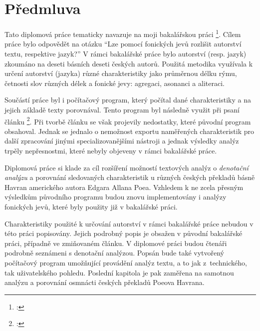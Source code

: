 \documentclass[dp.tex]{subfiles}
\begin{document}
\chapter*{Předmluva}
\label{chap:predmluva} 

Tato diplomová práce tematicky navazuje na moji bakalářskou práci \footnote{\cite{Slahora2012}: }. Cílem práce bylo odpovědět na otázku \enquote{Lze pomocí fonických jevů rozlišit autorství textu, respektive jazyk?} V rámci bakalářské práce bylo autorství (resp. jazyk) zkoumáno na deseti básních deseti českých autorů. Použitá metodika využívala k určení autorství (jazyka) různé charakteristiky jako průměrnou délku rýmu, četnosti slov různých délek a fonické jevy: agregaci, asonanci a aliteraci.

Součástí práce byl i počítačový program, který počítal dané charakteristiky a na jejich základě texty porovnával. Tento program byl následně využit při psaní článku \footnote{\cite{Marek2013}: }. Při tvorbě článku se však projevily nedostatky, které původní program obsahoval. Jednak se jednalo o nemožnost exportu naměřených charakteristik pro další zpracování jinými specializovanějšími nástroji a jednak výsledky analýz trpěly nepřesnostmi, které nebyly objeveny v rámci bakalářské práce.

Diplomová práce si klade za cíl rozšíření možností textových analýz o \textit{denotační analýzu} a porovnání sledovaných charakteristik u různých českých překladů básně Havran amerického autora Edgara Allana Poea. Vzhledem k ne zcela přesným výsledkům původního programu budou znovu implementovány i analýzy fonických jevů, které byly použity již v bakalářské práci.

Charakteristiky použité k určování autorství v rámci bakalářské práce nebudou v této práci popisovány. Jejich podrobný popis je obsažen v původní bakalářské práci, případně ve zmiňovaném článku. V diplomové práci budou čtenáři podrobně seznámeni s denotační analýzou. Popsán bude také vytvořený počítačový program umožňující provádění analýz textu, a to jak z~technického, tak uživatelského pohledu. Poslední kapitola je pak zaměřena na samotnou analýzu a porovnání osmnácti českých překladů Poeova Havrana.
\end{document}
